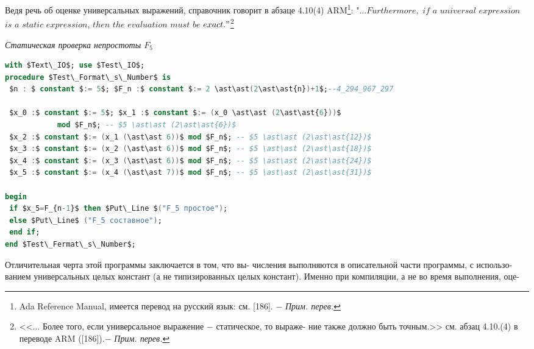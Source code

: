 Ведя речь об оценке универсальных выражений, справочник говорит\linebreak
в абзаце 4.10(4) ARM\footnote{
Ada Reference Manual, имеется перевод на русский язык: см. [186]. $-$\linebreak
\textit{Прим. перев.}
}:\newline
\hspace*{25pt}"$...Furthermore,$ $if$ $a$ $universal$ $expression$ $is$ $a$ $static$ $expression$,\newline
\hspace*{15pt}$then$ $the$ $evaluation$ $must$ $be$ $exact."$\footnote{
<<... Более того, если универсальное выражение $-$ статическое, то выраже-\linebreak
ние также должно быть точным.>> см. абзац 4.10.(4) в переводе ARM ([186]).$-$\linebreak
\textit{Прим. перев.}
}
\begin{center}
\textit{Статическая проверка непростоты $F_5$}
\end{center}
\begin{lstlisting}[mathescape=true, language=Ada, showstringspaces=false]
with $Text\_IO$; use $Test\_IO$;
procedure $Test\_Format\_s\_Number$ is
 $n : $ constant $:= 5$; $F_n :$ constant $:= 2 \ast\ast(2\ast\ast{n})+1$;--4_294_967_297
 
 $x_0 :$ constant $:= 5$; $x_1 :$ constant $:= (x_0 \ast\ast (2\ast\ast{6}))$
            mod $F_n$; -- $5 \ast\ast (2\ast\ast{6})$
 $x_2 :$ constant $:= (x_1 (\ast\ast 6))$ mod $F_n$; -- $5 \ast\ast (2\ast\ast{12})$
 $x_3 :$ constant $:= (x_2 (\ast\ast 6))$ mod $F_n$; -- $5 \ast\ast (2\ast\ast{18})$
 $x_4 :$ constant $:= (x_3 (\ast\ast 6))$ mod $F_n$; -- $5 \ast\ast (2\ast\ast{24})$
 $x_5 :$ constant $:= (x_4 (\ast\ast 7))$ mod $F_n$; -- $5 \ast\ast (2\ast\ast{31})$

begin
 if $x_5=F_{n-1}$ then $Put\_Line $("F_5 простое");
 else $Put\_Line$ ("F_5 составное");
 end if;
end $Test\_Fermat\_s\_Number$;
\end{lstlisting}
\hspace*{15pt}Отличительная  черта  этой  программы  заключается  в  том,  что  вы-\linebreak
числения  выполняются  в  описательной  части  программы,  с  использо-\linebreak
ванием  универсальных  целых  констант  (а  не  типизированных  целых\linebreak
констант).  Именно  при  компиляции,  а  не  во  время  выполнения,  оце-\linebreak

